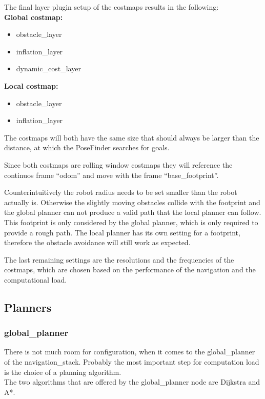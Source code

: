 The final layer plugin setup of the costmaps results in the following:\\

\textbf{Global costmap:}
\begin{itemize}
	\item obstacle\_layer
	\item inflation\_layer
	\item dynamic\_cost\_layer
\end{itemize}


\textbf{Local costmap:}
\begin{itemize}
	\item obstacle\_layer
	\item inflation\_layer
\end{itemize}

The costmaps will both have the same size that should always be larger than the distance, at which the PoseFinder searches for goals.

Since both costmaps are rolling window costmaps they will reference the continuos frame ``odom'' and move with the frame ``base\_footprint''.

Counterintuitively the robot radius needs to be set smaller than the robot actually is. Otherwise the slightly moving obstacles collide with the footprint and the global planner can not produce a valid path that the local planner can follow.\\
This footprint is only considered by the global planner, which is only required to provide a rough path. The local planner has its own setting for a footprint, therefore the obstacle avoidance will still work as expected.

The last remaining settings are the resolutions and the frequencies of the costmaps, which are chosen based on the performance of the navigation and the computational load.


\subsection{Planners}

\subsubsection{global\_planner}
\label{globalplannertest}
There is not much room for configuration, when it comes to the global\_planner of the navigation\_stack. Probably the most important step for computation load is the choice of a planning algorithm.\\
The two algorithms that are offered by the global\_planner node are Dijkstra and A*.\\

